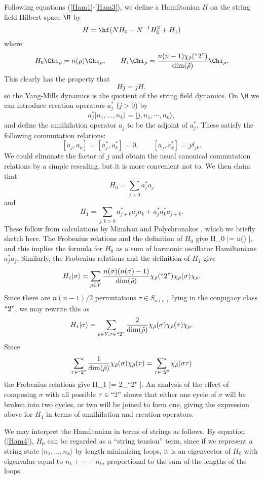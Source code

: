 Following equations (\ref{Ham1}-\ref{Ham3}),
we define a Hamiltonian $H$ on the string field Hilbert space $\H$ by
\[      H = \hf(N H_0 - N^{-1} H_0^2 + H_1)  \]
where
\[    H_0 \Chi_\rho =  n(\rho)\Chi_\rho  ,\qquad
  H_1 \Chi_\rho =  {n(n-1)\chi_{\tilde\rho}(``2")\over \dim(\tilde\rho)}
\Chi_\rho.  \]
This clearly has the property that
\[             H j = j H ,\]
so the Yang-Mills dynamics is the quotient of the string field
dynamics.
On $\H$ we can introduce creation operators $a_j^\ast$ ($j > 0$) by
\[       a_j^\ast |n_1, \dots, n_k\rangle =  |j, n_1,
\cdots, n_k\rangle  ,\]
and define the
annihilation operator $a_j$ to be the adjoint of $a_j^\ast$.
These satisfy the following commutation relations:
\[     [a_j,a_k] = [a^\ast_j, a^\ast_k] = 0 ,\qquad
     [a_j, a^\ast_k] = j\delta_{jk}  .\]
We could eliminate the factor of $j$ and obtain the usual canonical
commutation relations by a simple rescaling, but it is more convenient
not to.   We then claim that
\[         H_0 = \sum_{j > 0}  a^\ast_j a_j  \]
and
\[         H_1 = \sum_{j,k > 0}  a^\ast_{j+k} a_j a_k +
a^\ast_j a^\ast_k a_{j+k}  .\]
These follow from calculations by Minahan and Polychronakos
\cite{MP}, which we briefly sketch here.  The Frobenius relations
and the definition of $H_0$ give
\ba          H_0 |\sigma\rangle = n(\sigma) |\sigma\rangle ,
\label{Ham4} \ea
and this implies the formula for $H_0$ as a sum of harmonic oscillator
Hamiltonians $a^\ast_j a_j$.  Similarly, the Frobenius relations and
the definition of $H_1$ give
\[      H_1 |\sigma\rangle =  \sum_{\rho\in Y} {n(\sigma)(n(\sigma)-1)\over
\dim(\tilde \rho)} \chi_{\tilde\rho}(``2") \chi_{\tilde\rho}(\sigma)
\chi_\rho  .\]
Since there are $n(n-1)/2$ permutations $\tau \in S_{n(\sigma)}$ lying in
the conjugacy class $``2"$, we may rewrite this as
\[      H_1 |\sigma\rangle =  \sum_{\rho\in Y, \tau \in ``2"}
{2\over \dim(\tilde \rho)}
\chi_{\tilde\rho}(\sigma) \chi_{\tilde\rho}(\tau) \chi_\rho  .\]
Since
\[        \sum_{\tau \in ``2"} {1\over \dim(\tilde\rho)}
\chi_{\tilde\rho}(\sigma) \chi_{\tilde\rho}(\tau) =
\sum_{\tau \in ``2"} \chi_{\tilde\rho}(\sigma\tau)  \]
the Frobenius relations give
\ba      H_1 |\sigma\rangle =  2\sum_{\tau \in ``2"}
|\sigma\tau\rangle  .\label{Ham5}  \ea
An analysis of the effect of composing $\sigma$ with all possible
$\tau \in ``2"$ shows that either one cycle of $\sigma$ will be broken
into two cycles, or two will be joined to form one, giving the
expression above for $H_1$ in terms of annihilation and creation
operators.

We may interpret the Hamiltonian in terms of strings
as follows.  By equation (\ref{Ham4}),
$H_0$ can be regarded as a ``string
tension'' term, since if we represent a string state $|n_1, \dots,
n_k\rangle$ by length-minimizing loops, it is an eigenvector of $H_0$
with eigenvalue equal to $n_1 + \cdots + n_k$, proportional to
the sum of the lengths of the loops.

